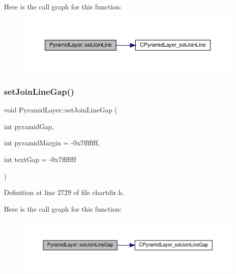 Here is the call graph for this function\+:
\nopagebreak
\begin{figure}[H]
\begin{center}
\leavevmode
\includegraphics[width=350pt]{class_pyramid_layer_ae9339f4fc54d82299e5d392ccbe87af3_cgraph}
\end{center}
\end{figure}
\mbox{\label{class_pyramid_layer_ae69f1b839b4c61ebd05d9674b5022f4c}} 
\subsubsection{\texorpdfstring{set\+Join\+Line\+Gap()}{setJoinLineGap()}}
{\footnotesize\ttfamily void Pyramid\+Layer\+::set\+Join\+Line\+Gap (\begin{DoxyParamCaption}\item[{int}]{pyramid\+Gap,  }\item[{int}]{pyramid\+Margin = {\ttfamily -\/0x7fffffff},  }\item[{int}]{text\+Gap = {\ttfamily -\/0x7fffffff} }\end{DoxyParamCaption})\hspace{0.3cm}{\ttfamily [inline]}}



Definition at line 2729 of file chartdir.\+h.

Here is the call graph for this function\+:
\nopagebreak
\begin{figure}[H]
\begin{center}
\leavevmode
\includegraphics[width=350pt]{class_pyramid_layer_ae69f1b839b4c61ebd05d9674b5022f4c_cgraph}
\end{center}
\end{figure}
\mbox{\label{class_pyramid_layer_a0501abd3ffb21f08fc4f57f6cb6c2d62}} 
